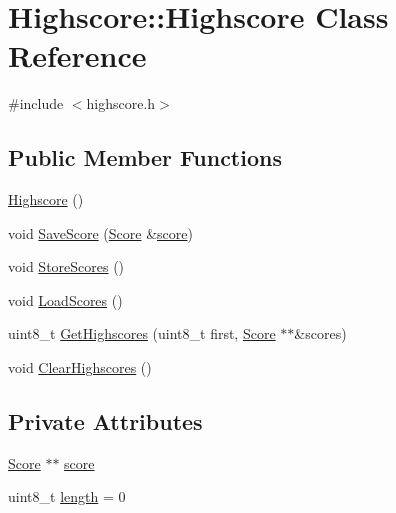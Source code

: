\hypertarget{class_highscore_1_1_highscore}{}\section{Highscore\+:\+:Highscore Class Reference}
\label{class_highscore_1_1_highscore}


{\ttfamily \#include $<$highscore.\+h$>$}

\subsection*{Public Member Functions}
\begin{DoxyCompactItemize}
\item 
\hyperlink{class_highscore_1_1_highscore_a64076b0cd51d8045a6cac3e53e2ada79}{Highscore} ()
\item 
void \hyperlink{class_highscore_1_1_highscore_ae19e8a6c55b49d6dd874b61ef496dcea}{Save\+Score} (\hyperlink{struct_highscore_1_1_score}{Score} \&\hyperlink{class_highscore_1_1_highscore_a569a403dc24a8fa67efd7065148f4c9d}{score})
\item 
void \hyperlink{class_highscore_1_1_highscore_ad0e1b3277228a38513b5c86059ebcd6d}{Store\+Scores} ()
\item 
void \hyperlink{class_highscore_1_1_highscore_acaba923c4f4acb3c174fb5e325f1bc5e}{Load\+Scores} ()
\item 
uint8\+\_\+t \hyperlink{class_highscore_1_1_highscore_af863b0108cf33796e96efa6d0ba613a1}{Get\+Highscores} (uint8\+\_\+t first, \hyperlink{struct_highscore_1_1_score}{Score} $\ast$$\ast$\&scores)
\item 
void \hyperlink{class_highscore_1_1_highscore_ad2d0f11408e3d47c7b8434a71212f6c2}{Clear\+Highscores} ()
\end{DoxyCompactItemize}
\subsection*{Private Attributes}
\begin{DoxyCompactItemize}
\item 
\hyperlink{struct_highscore_1_1_score}{Score} $\ast$$\ast$ \hyperlink{class_highscore_1_1_highscore_a569a403dc24a8fa67efd7065148f4c9d}{score}
\item 
uint8\+\_\+t \hyperlink{class_highscore_1_1_highscore_a18a119eae9c24ab69477411b9bf45867}{length} = 0
\end{DoxyCompactItemize}


